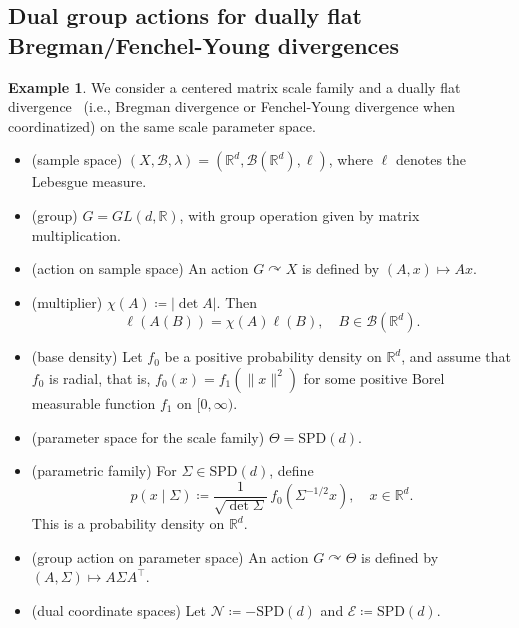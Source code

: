 \documentclass[a4paper, reqno, 11pt]{article}
\theoremstyle{definition}
\newtheorem{Exa}[Thm]{Example}
\def\SPD{\mathrm{SPD}}
\begin{document}
 \subsection{Dual group actions for dually flat  Bregman/Fenchel-Young divergences}\label{sec:bdfy}

\begin{Exa}\label{exa:dual-group-action}
We consider a centered matrix scale family and a dually flat divergence~\cite{ohara1996dualistic,IG-2016} (i.e., Bregman divergence or Fenchel-Young divergence when coordinatized) on the same scale
parameter space.

\begin{itemize}
\item (sample space)  $(X,\mathcal{B},\lambda)=(\mathbb{R}^d,\mathcal{B}(\mathbb{R}^d),\ell)$, where
$\ell$ denotes the Lebesgue measure.

\item (group)  $G=GL(d,\mathbb{R})$, with group operation given by matrix multiplication.

\item (action on sample space)  An action $G\curvearrowright X$ is defined by $(A,x)\mapsto Ax$.

\item (multiplier)  $\chi(A)\coloneqq |\det A|$. Then
\[ \ell(A(B))=\chi(A)\ell(B), \quad B\in \mathcal{B}(\mathbb{R}^d). \]

\item (base density)  Let $f_0$ be a positive probability density on $\mathbb{R}^d$, and assume that
$f_0$ is radial, that is, $f_0(x) = f_1 \left(\|x\|^2 \right)$
for some positive Borel measurable function $f_1$ on $[0,\infty)$.

\item (parameter space for the scale family)  $\Theta = \SPD(d)$.

\item (parametric family)  For $\Sigma\in \SPD(d)$, define
\[ p(x\mid \Sigma)\coloneqq \frac{1}{\sqrt{\det\Sigma}}\,f_0(\Sigma^{-1/2}x), \quad x\in\mathbb{R}^d.\]
This is a probability density on $\mathbb{R}^d$.

\item (group action on parameter space) An action $G\curvearrowright \Theta$ is defined by $(A,\Sigma) \mapsto A\Sigma A^{\top}$.

\item (dual coordinate spaces)  Let $\mathcal{N} \coloneqq -\SPD(d)$ and $\mathcal{E}\coloneqq \SPD(d)$. 


\end{itemize}
\end{Exa}
\end{document}
